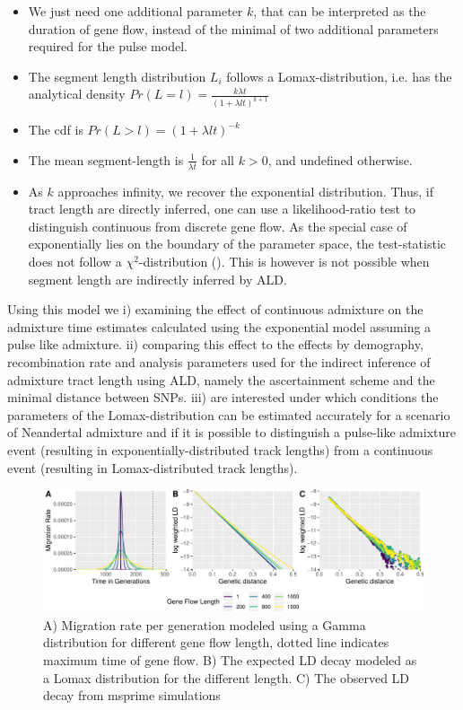 \documentclass[]{article}
\begin{document}
\begin{itemize}
    \item We just need one additional parameter $k$, that can be interpreted as the duration of gene flow, instead of the minimal of two additional parameters required for the pulse model.
    \item The segment length distribution $L_i$ follows a Lomax-distribution, i.e. has the analytical density $Pr(L=l) = \frac{k \lambda t}{(1 + \lambda l t)^{k+1}}$
    \item The cdf is $Pr(L > l) = (1+\lambda l t )^{-k}$
    \item The mean segment-length is  $\frac{1}{\lambda t}$ for all $k > 0$, and undefined otherwise. 
    \item As $k$ approaches infinity, we recover the exponential distribution. Thus, if tract length are directly inferred, one can use a likelihood-ratio test to distinguish continuous from discrete gene flow. As the special case of exponentially lies on the boundary of the parameter space, the test-statistic does not follow a $\chi^2$-distribution (\cite{Kozubowski_Testing_2008}). This is however is not possible when segment length are indirectly inferred by ALD.
\end{itemize}

Using this model we i) examining the effect of continuous admixture on
the admixture time estimates calculated using the exponential model
assuming a pulse like admixture. ii) comparing this effect to the
effects by demography, recombination rate and analysis parameters used
for the indirect inference of admixture tract length using ALD, namely
the ascertainment scheme and the minimal distance between SNPs. iii) are
interested under which conditions the parameters of the
Lomax-distribution can be estimated accurately for a scenario of
Neandertal admixture and if it is possible to distinguish a pulse-like
admixture event (resulting in exponentially-distributed track lengths)
from a continuous event (resulting in Lomax-distributed track lengths).

\begin{figure}
\centering
\includegraphics{Admixture_Time_Inference_Paper_Draft_files/figure-latex/fig1-1.pdf}
\caption{\label{fig:fig1} A) Migration rate per generation modeled using
a Gamma distribution for different gene flow length, dotted line
indicates maximum time of gene flow. B) The expected LD decay modeled as
a Lomax distribution for the different length. C) The observed LD decay
from msprime simulations}
\end{figure}
\end{document}
